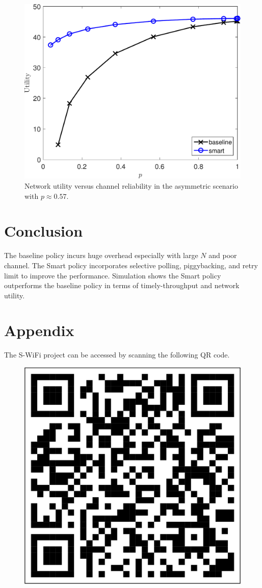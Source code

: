 \documentclass{article}
\begin{document}
\begin{figure}[htbp]
\centering
\includegraphics[scale=0.5]{U_p_asym.pdf}
\caption{Network utility versus channel reliability in the asymmetric scenario with $p\approx 0.57$.}
\label{sim: asym: utility}
\end{figure}

\section{Conclusion}
The baseline policy incurs huge overhead especially with large $N$ and poor channel. The Smart policy incorporates selective polling, piggybacking, and retry limit to improve the performance. Simulation shows the Smart policy outperforms the baseline policy in terms of timely-throughput and network utility.

\section{Appendix}
The S-WiFi project can be accessed by scanning the following QR code.
\begin{figure}[htbp]
\hspace{3mm}
\center
\includegraphics[scale=0.2]{url.pdf}
\end{figure}
\end{document}

